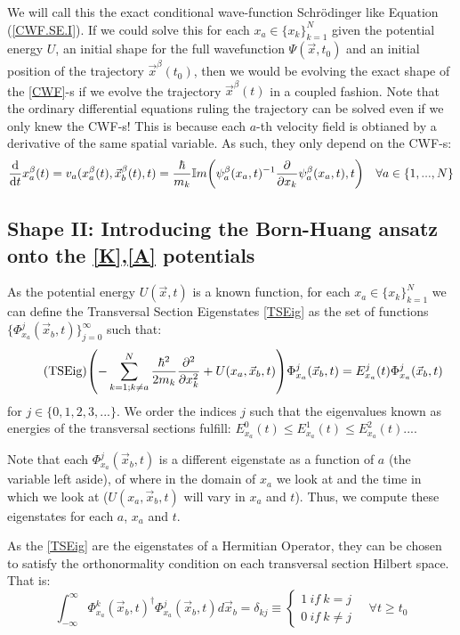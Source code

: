 \documentclass[11pt, a4paper]{article} %
\begin{document}
We will call this the exact conditional wave-function Schrödinger like Equation (\ref{CWF.SE.I}). If we could solve this for each $x_a\in\{x_k\}_{k=1}^N$ given the potential energy $U$, an initial shape for the full wavefunction $\Psi(\vec{x}, t_0)$ and an initial position of the trajectory $\vec{x}^\beta(t_0)$, then we would be evolving the exact shape of the \ref{CWF}-s if we evolve the trajectory $\vec{x}^\beta(t)$ in a coupled fashion. Note that the ordinary differential equations ruling the trajectory can be solved even if we only knew the CWF-s! This is because each $a$-th velocity field is obtianed by a derivative of the same spatial variable. As such, they only depend on the CWF-s:
$$
\dv{}{t}x^\beta_a(t)=v_a(x_a^\beta (t), \vec{x}^\beta_b(t),t)=\frac{\hbar}{m_k}\mathbb{I}m\qty(\psi_a^\beta(x_a, t)^{-1}\pdv{}{x_k}\psi_a^\beta(x_a, t),t) \quad \forall a\in \{1,...,N\}
$$
\subsection{Shape II: Introducing the Born-Huang ansatz onto the \ref{K},\ref{A} potentials}

As the potential energy $U(\vec{x},t)$ is a known function, for each $x_a\in\{x_k\}_{k=1}^N$  we can define the Transversal Section Eigenstates \ref{TSEig} as the set of functions $\{\Phi_{x_a}^j(\vec{x}_b,t)\}_{j=0}^\infty$ such that:
\begin{equation}\label{TSEig}\tag{TSEig}
\qty(- \sum_{k=1; k\neq a}^{N} \frac{\hbar^2}{2m_k}\pdv[2]{}{x_k}+U(x_a,\vec{x}_b,t) )\Phi_{x_a}^j(\vec{x}_b,t) = E_{x_a}^j(t)\Phi_{x_a}^j(\vec{x}_b,t)
\end{equation}
for $j\in\{0,1,2,3,...\}$. We order the indices $j$ such that the eigenvalues known as energies of the transversal sections fulfill: $E_{x_a}^0(t)\leq E_{x_a}^1(t)\leq E_{x_a}^2(t)...$.

Note that each $\Phi_{x_a}^j(\vec{x}_b,t)$ is a different eigenstate as a function of $a$ (the variable left aside), of where in the domain of $x_a$ we look at and the time in which we look at ($U(x_a,\vec{x}_b,t)$ will vary in $x_a$ and $t$). Thus, we compute these eigenstates for each $a$, $x_a$ and $t$.

As the \ref{TSEig} are the eigenstates of a Hermitian Operator, they can be chosen to satisfy the orthonormality condition on each transversal section Hilbert space. That is:
$$
\int_{-\infty}^\infty \Phi_{x_a}^k(\vec{x}_b,t)^\dagger \Phi_{x_a}^j(\vec{x}_b,t) d\vec{x}_b=\delta_{kj} \equiv \begin{cases}1\ if\ k=j\\0\ if\ k\neq j \end{cases}\quad \forall t\geq t_0
$$
\end{document}
